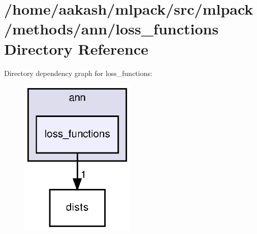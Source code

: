 \section{/home/aakash/mlpack/src/mlpack/methods/ann/loss\+\_\+functions Directory Reference}
\label{dir_108dc4f74c6c9629904c71a4ea9deaa7}
Directory dependency graph for loss\+\_\+functions\+:
\nopagebreak
\begin{figure}[H]
\begin{center}
\leavevmode
\includegraphics[width=156pt]{dir_108dc4f74c6c9629904c71a4ea9deaa7_dep}
\end{center}
\end{figure}
